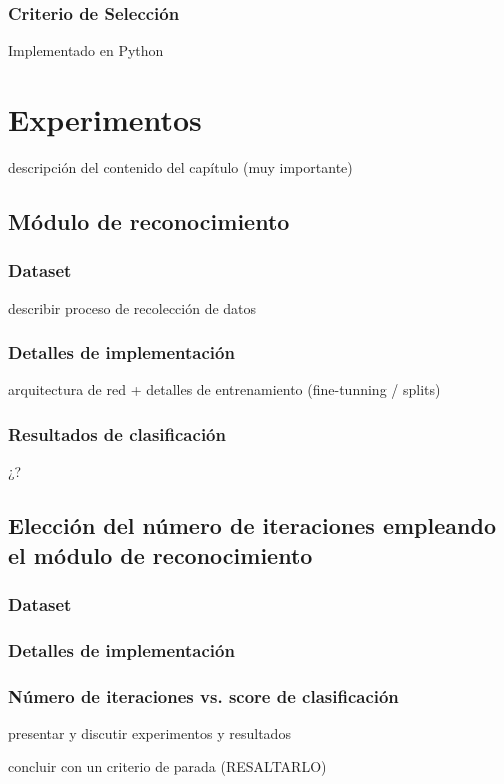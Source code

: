 \documentclass[a4paper,11pt,spanish]{book}
\begin{document}
      \subsection{Criterio de Selección}
	Implementado en Python


\chapter{Experimentos}

descripción del contenido del capítulo (muy importante)

\section{Módulo de reconocimiento}

\subsection{Dataset}
describir proceso de recolección de datos
\subsection{Detalles de implementación}
arquitectura de red + detalles de entrenamiento (fine-tunning / splits)
\subsection{Resultados de clasificación}
¿?

\section{Elección del número de iteraciones empleando el módulo de
  reconocimiento}
\subsection{Dataset}
\subsection{Detalles de implementación}
\subsection{Número de iteraciones vs. score de clasificación}

presentar y discutir experimentos y resultados

concluir con un criterio de parada (RESALTARLO)
\end{document}
